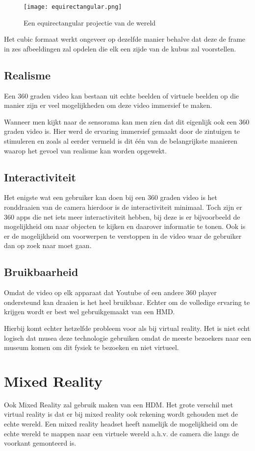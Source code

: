 \begin{figure}
    \texttt{[image: equirectangular.png]}
    \caption{Een equirectangular projectie van de wereld}
    \label{fig:equirectangularprojection}
\end{figure}

Het cubic formaat werkt ongeveer op dezelfde manier behalve dat deze de frame in zes afbeeldingen zal opdelen die elk een zijde van de kubus zal voorstellen.

\subsection{Realisme}
Een 360 graden video kan bestaan uit echte beelden of virtuele beelden op die manier zijn er veel mogelijkheden om deze video immersief te maken. 

Wanneer men kijkt naar de sensorama kan men zien dat dit eigenlijk ook een 360 graden video is. Hier werd de ervaring immersief gemaakt door de zintuigen te stimuleren en zoals al eerder vermeld is dit één van de belangrijkste manieren waarop het gevoel van realisme kan worden opgewekt.

\subsection{Interactiviteit}
Het enigste wat een gebruiker kan doen bij een 360 graden video is het ronddraaien van de camera hierdoor is de interactiviteit minimaal. Toch zijn er 360 apps die net iets meer interactiviteit hebben, bij deze is er bijvoorbeeld de mogelijkheid om naar objecten te kijken en daarover informatie te tonen. Ook is er de mogelijkheid om voorwerpen te verstoppen in de video waar de gebruiker dan op zoek naar moet gaan.
\subsection{Bruikbaarheid}
Omdat de video op elk apparaat dat Youtube of een andere 360 player ondersteund kan draaien is het heel bruikbaar. Echter om de volledige ervaring te krijgen wordt er best wel gebruikgemaakt van een HMD.

Hierbij komt echter hetzelfde probleem voor als bij virtual reality. Het is niet echt logisch dat musea deze technologie gebruiken omdat de meeste bezoekers naar een museum komen om dit fysiek te bezoeken en niet virtueel.

\section{Mixed Reality} \label{sec:mixedreality}
Ook Mixed Reality zal gebruik maken van een HDM. Het grote verschil met virtual reality is dat er bij mixed reality ook rekening wordt gehouden met de echte wereld. Een mixed reality headset heeft namelijk de mogelijkheid om de echte wereld te mappen naar een virtuele wereld a.h.v. de camera die langs de voorkant gemonteerd is.

